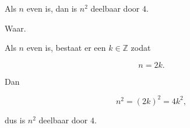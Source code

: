 \documentclass{ximera}
\begin{document}
\begin{oefening}[Deelbaarheid]{\oefB\ESS}
\begin{question}
Als $n$ even is, dan is $n^2$ deelbaar door $4$.

\begin{oplossing}

Waar.

Als $n$ even is, bestaat er een $k\in\mathbb{Z}$ zodat

\[
n=2k.
\]

Dan

\[
n^2=(2k)^2=4k^2,
\]

dus is $n^2$ deelbaar door $4$.

\end{oplossing}

\end{question}

\end{oefening}


\end{document}
